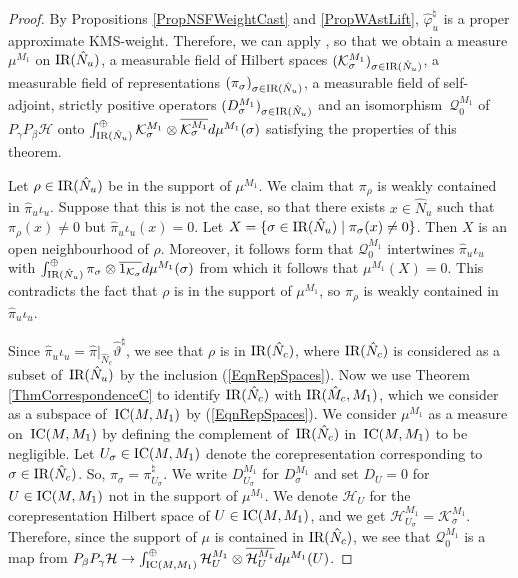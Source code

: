 \documentclass[11pt]{article}
\numberwithin{equation}{section}
\theoremstyle{definition}
\newcommand{\cHil}{\mathcal{H}}
\newcommand{\ICMM}{\text{\rm IC}(M, M_1)}
\newcommand{\IR}{\text{\rm IR}}
\begin{document}
\setcounter{section}{7}
\setcounter{subsection}{0}
\setcounter{subsubsection}{0}
\setcounter{thm}{1}
\setcounter{equation}{0}
\begin{proof}
By  Propositions \ref{PropNSFWeightCast} and \ref{PropWAstLift}, $\hat{\varphi}_u^\natural$ is a proper approximate KMS-weight. Therefore, we can apply \cite[Theorem 3.4.5]{Des}, so that we obtain a measure $\mu^{M_1}$ on $\IR(\hat{N}_u)$, a measurable f\/ield of Hilbert spaces $(\mathcal{K}_\sigma^{M_1})_{\sigma \in \IR(\hat{N}_u)}$, a measurable f\/ield of representations $(\pi_\sigma)_{\sigma \in \IR(\hat{N}_u)}$, a measurable f\/ield of self-adjoint, strictly positive operators $(D_\sigma^{M_1})_{\sigma \in \IR(\hat{N}_u)}$ and an isomorphism~$\mathcal{Q}_0^{M_1}$ of $P_\gamma P_\beta \cHil$ onto $\int_{\IR(\hat{N}_u)}^\oplus \mathcal{K}_\sigma^{M_1} \otimes \overline{\mathcal{K}_\sigma^{M_1}} d \mu^{M_1}(\sigma)$ satisfying the properties of this theorem.



Let $\rho \in \IR(\hat{N}_u)$ be in the support of $\mu^{M_1}$.
We claim that $\pi_\rho$ is weakly contained in $\hat{\pi}_u \iota_u$. Suppose that this is not the case, so that there exists $x \in \hat{N}_u$ such that $\pi_\rho(x) \not = 0$ but $\hat{\pi}_u \iota_u(x)  = 0$. Let $X = \{ \sigma \in \IR(\hat{N}_u) \mid \pi_\sigma(x) \not = 0 \}$. Then $X$ is an open neighbourhood of $\rho$. Moreover, it follows form \cite[Theorem 3.4.5]{Des} that $\mathcal{Q}_0^{M_1}$ intertwines $\hat{\pi}_u \iota_u$ with $\int_{\IR(\hat{N}_u)}^\oplus \pi_\sigma \otimes \overline{1_{\mathcal{K}_\sigma}} d\mu^{M_1}(\sigma)$ from which it follows that $\mu^{M_1}(X) = 0$. This contradicts the fact that $\rho$ is in the support of $\mu^{M_1}$, so $\pi_\rho$ is weakly contained in $\hat{\pi}_u \iota_u$.

Since $\hat{\pi}_u \iota_u = \hat{\pi}\vert_{\hat{N}_c} \hat{\vartheta}^\natural$, we see that $\rho$ is in $\IR(\hat{N}_c)$, where $\IR(\hat{N}_c)$ is considered as a subset of~$\IR(\hat{N}_u)$ by the inclusion (\ref{EqnRepSpaces}).
Now we use Theorem \ref{ThmCorrespondenceC} to identify $\IR(\hat{N}_c)$ with $\IR(\hat{M}_c, M_1)$, which we consider as a subspace of~$\ICMM$ by (\ref{EqnRepSpaces}).  We consider $\mu^{M_1}$ as a measure on~$\ICMM$ by def\/ining the complement of~$\IR(\hat{N}_c)$ in~$\ICMM$ to be negligible. Let $U_\sigma \in \ICMM$ denote the corepresentation corresponding to $\sigma \in \IR(\hat{N}_c)$. So,
$
\pi_\sigma = \pi_{U_\sigma}^\natural.
$
We write $D_{U_\sigma}^{M_1}$ for $D_\sigma^{M_1}$ and set $D_U = 0$ for $U \in \ICMM $ not in the support of $\mu^{M_1}$. We denote $\cHil_U$ for the corepresentation Hilbert space of $U \in \ICMM$, and we get $\cHil_{U_\sigma}^{M_1} = \mathcal{K}_\sigma^{M_1}$.  Therefore, since the support of $\mu$ is contained in $\IR(\hat{N}_c)$, we see that $\mathcal{Q}_0^{M_1}$ is a map from $P_\beta P_\gamma \cHil \rightarrow \int^\oplus_{\ICMM} \cHil_U^{M_1} \otimes \overline{\cHil_U^{M_1}} d\mu^{M_1}(U)$.




\end{proof}
\end{document}
